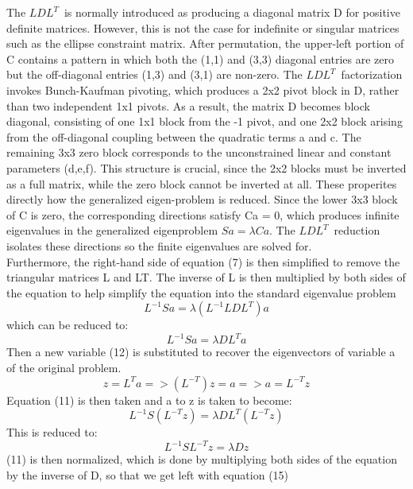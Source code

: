 The $LDL^{T}\,$ is normally introduced as producing a diagonal matrix D for positive definite matrices. However, this is not the case for indefinite or singular matrices such as the ellipse constraint matrix. After permutation, the upper-left portion of C contains a pattern in which both the (1,1) and (3,3) diagonal entries are zero but the off-diagonal entries (1,3) and (3,1) are non-zero. The $LDL^{T}\,$ factorization invokes Bunch-Kaufman pivoting, which produces a 2x2 pivot block in D, rather than two independent 1x1 pivots. As a result, the matrix D becomes block diagonal, consisting of one 1x1 block from the -1 pivot, and one 2x2 block arising from the off-diagonal coupling between the quadratic terms a and c. The remaining 3x3 zero block corresponds to the unconstrained linear and constant parameters (d,e,f). This structure is crucial, since the 2x2 blocks must be inverted as a full matrix, while the zero block cannot be inverted at all. These properites directly how the generalized eigen-problem is reduced. Since the lower 3x3 block of C is zero, the corresponding directions satisfy Ca = 0, which produces infinite eigenvalues in the generalized eigenproblem $Sa = {\lambda}Ca$. The $LDL^{T}\,$ reduction isolates these directions so the finite eigenvalues are solved for. 
\\Furthermore, the right-hand side of equation (7) is then simplified to remove the triangular matrices L and LT. The inverse of L is then multiplied by both sides of the equation to help simplify the equation into the standard eigenvalue problem
\begin{equation}
    L^{-1}Sa = \lambda (L^{-1} LDL^{T})a 
\end{equation}
which can be reduced to: 
\begin{equation}
    L^{-1}Sa = \lambda DL^{T}a
\end{equation}
Then a new variable (12) is substituted to recover the eigenvectors of variable a of the original problem. 
\begin{equation}
    z = L^{T}a => (L^{-T})z = a => a = L^{-T}z
\end{equation}
Equation (11) is then taken and a to z is taken to become: 
\begin{equation}
    L^{-1} S(L^{-T}z) = \lambda DL^{T}(L^{-T}z)
\end{equation}
This is reduced to: 
\begin{equation}
    L^{-1}SL^{-T}z = \lambda Dz
\end{equation}
 (11) is then normalized, which is done by multiplying both sides of the equation by the inverse of D, so that we get left with equation (15)
